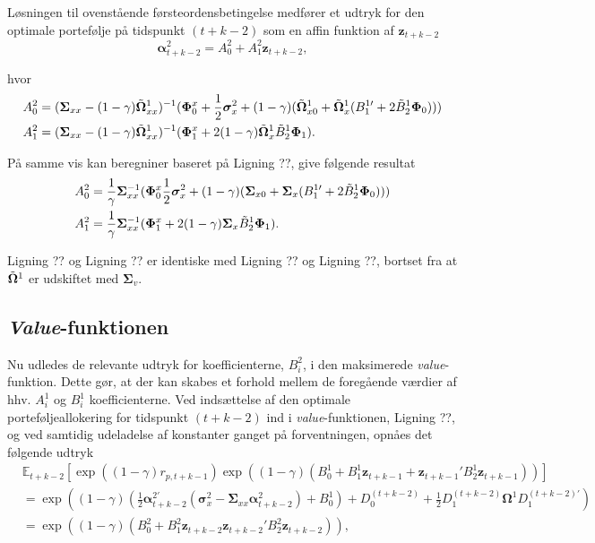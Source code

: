 \documentclass[
  a4paper,
  oneside]{memoir}
\begin{document}
Løsningen til ovenstående førsteordensbetingelse medfører et udtryk for den optimale portefølje på tidspunkt \((t+k-2)\) som en affin funktion af \(\bm{z}_{t+k-2}\)
\[\bm{\alpha}_{t+k-2}^2 = A_0^2 + A_1^2 \bm{z}_{t+k-2},\]

hvor
\begin{align*}
A_0^2&=(\bm{\Sigma}_{xx} - (1-\gamma)\Tilde{\bm{\Omega}}_{xx}^1)^{-1} (\bm{\Phi}_0^x + \frac{1}{2} \bm{\sigma}_x^2 + (1-\gamma) (\Tilde{\bm{\Omega}}_{x0}^1 + \Tilde{\bm{\Omega}}_{x}^1 (B_1^{1\prime} + 2\Tilde{B}_2^{1}\bm{\Phi}_0)))\\
A_1^2&=(\bm{\Sigma}_{xx} - (1-\gamma)\Tilde{\bm{\Omega}}_{xx}^1)^{-1}(\bm{\Phi}_1^x+2(1-\gamma) \Tilde{\bm{\Omega}}_{x}^1 \Tilde{B} _2^{1}\bm{\Phi}_1).
\end{align*}

På samme vis kan beregniner baseret på Ligning ??, give følgende resultat
\begin{align*}
A_0^2&=\frac{1}{\gamma} \bm{\Sigma}_{xx}^{-1} (\bm{\Phi}_0^x \frac{1}{2} \bm{\sigma}_x^2 + (1-\gamma ) (\bm{\Sigma}_{x0} + \bm{\Sigma}_x (B_1^{1\prime} + 2\Tilde{B}_2^{1}\bm{\Phi}_0 )))\\
A_1^2&=\frac{1}{\gamma} \bm{\Sigma}_{xx}^{-1} (\bm{\Phi}_1^x + 2(1-\gamma) \bm{\Sigma}_x \Tilde{B}_2^{1}\bm{\Phi}_1).
\end{align*}

Ligning ?? og Ligning ?? er identiske med Ligning ?? og Ligning ??, bortset fra at \(\Tilde{\bm{\Omega}}^1\) er udskiftet med \(\bm{\Sigma}_v\).

\hypertarget{value-funktionen-1}{%
\subsection{\texorpdfstring{\emph{Value}-funktionen}{Value-funktionen}}\label{value-funktionen-1}}

Nu udledes de relevante udtryk for koefficienterne, \(B_i^2\), i den maksimerede \emph{value}-funktion. Dette gør, at der kan skabes et forhold mellem de foregående værdier af hhv. \(A_i^1\) og \(B_i^1\) koefficienterne. Ved indsættelse af den optimale porteføljeallokering for tidspunkt \((t+k-2)\) ind i \emph{value}-funktionen, Ligning ??, og ved samtidig udeladelse af konstanter ganget på forventningen, opnåes det følgende udtryk
\begin{align*}
&\mathbb{E}_{t+k-2}[ \exp( (1-\gamma)  r_{p,t+k-1})\exp ( (1-\gamma) (B_0^1 + B_1^1\bm{z}_{t+k-1}  + \bm{z}_{t+k-1}' B_2^1 \bm{z}_{t+k-1}  ))]\\
&=\exp((1-\gamma)(\frac{1}{2}\bm{\alpha}_{t+k-2}^{2\prime} (\bm{\sigma}_x^2 - \bm{\Sigma}_{xx} \bm{\alpha}_{t+k-2}^2) + B_0^1 ) + D_0^{(t+k-2)} + \frac{1}{2} D_1^{(t+k-2)} \bm{\Omega}^1 D_1^{(t+k-2)\prime})\\
&=\exp((1-\gamma)(B_0^2 + B_1^2 \bm{z}_{t+k-2} \bm{z}_{t+k-2}' B_2^2 \bm{z}_{t+k-2} )),
\end{align*}
\end{document}

